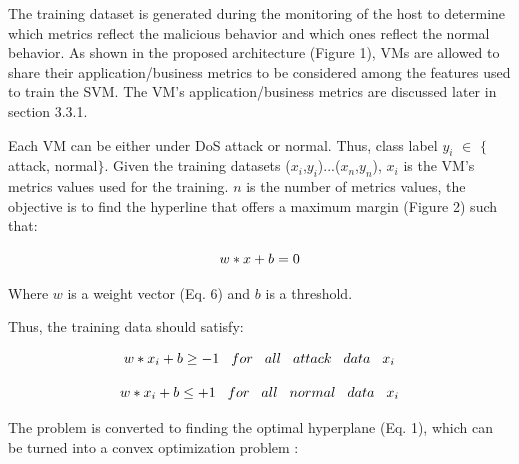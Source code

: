 \documentclass[twocolumn]{bmcart}%
\begin{document}
The training dataset is generated during the monitoring of the host to determine which metrics reflect the malicious behavior and which ones reflect the normal behavior. As shown in the proposed architecture (Figure 1), VMs are allowed to share their application/business metrics to be considered among the features used to train the SVM. The VM's application/business metrics are discussed later in section 3.3.1.

Each VM can be either under DoS attack or normal. Thus, class label $y_{i}$ $\in$ $\{$attack, normal$\}$. Given the training datasets  ($x_{i}$,$y_{i}$)...($x_{n}$,$y_{n}$), $x_{i}$ is the VM's metrics values used for the training. $n$ is the number of metrics values, the objective is to find the hyperline that offers a maximum margin (Figure 2) such that:

\begin{equation}\small
  w \ast x + b = 0
\end{equation}



Where $w$ is a weight vector (Eq. 6) and $b$ is a threshold.

Thus, the training data should satisfy:

\begin{equation}\small
  w \ast x_{i} + b \geq -1 \hspace{0.3cm} for \hspace{0.3cm} all \hspace{0.3cm} attack \hspace{0.3cm}data \hspace{0.3cm} x_{i}
\end{equation}

\begin{equation}\small
  w \ast x_{i} + b \leq +1 \hspace{0.3cm} for \hspace{0.3cm} all \hspace{0.3cm} normal \hspace{0.3cm}data \hspace{0.3cm} x_{i}
\end{equation}


The problem is converted to finding the optimal hyperplane (Eq. 1), which can be turned into a convex optimization problem \cite{scholkopf2002learning}:
\end{document}
